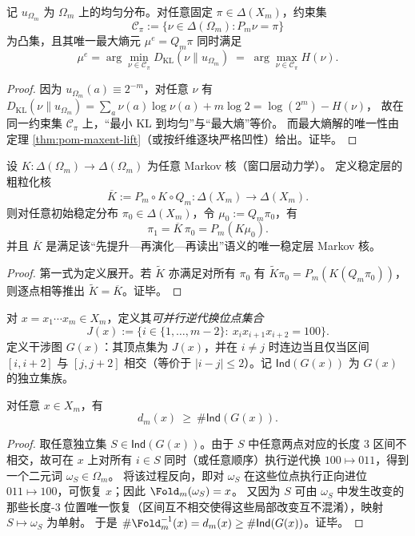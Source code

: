 \begin{corollary}\label{cor:pom-Iproj-maxent}
记 $u_{\Omega_m}$ 为 $\Omega_m$ 上的均匀分布。对任意固定 $\pi\in\Delta(X_m)$，约束集
\[
\mathcal{C}_\pi:=\{\nu\in\Delta(\Omega_m):P_m\nu=\pi\}
\]
为凸集，且其唯一最大熵元 $\mu^e=Q_m\pi$ 同时满足
\[
\boxed{\;
\mu^e=\arg\min_{\nu\in\mathcal{C}_\pi}D_{\mathrm{KL}}(\nu\|u_{\Omega_m})
\;=\;
\arg\max_{\nu\in\mathcal{C}_\pi}H(\nu).
\;}
\]
\end{corollary}
\begin{proof}
因为 $u_{\Omega_m}(a)\equiv 2^{-m}$，对任意 $\nu$ 有
\(
D_{\mathrm{KL}}(\nu\|u_{\Omega_m})=\sum_a \nu(a)\log\nu(a)+m\log 2=\log(2^m)-H(\nu)
\)，
故在同一约束集 $\mathcal{C}_\pi$ 上，“最小 KL 到均匀”与“最大熵”等价。
而最大熵解的唯一性由定理 \ref{thm:pom-maxent-lift}（或按纤维逐块严格凹性）给出。证毕。
\end{proof}

\begin{theorem}\label{thm:pom-coarse-grained-kernel}
设 $K:\Delta(\Omega_m)\to\Delta(\Omega_m)$ 为任意 Markov 核（窗口层动力学）。
定义稳定层的粗粒化核
\[
\overline K:=P_m\circ K\circ Q_m:\Delta(X_m)\to\Delta(X_m).
\]
则对任意初始稳定分布 $\pi_0\in\Delta(X_m)$，令 $\mu_0:=Q_m\pi_0$，有
\[
\pi_1=\overline K\,\pi_0=P_m(K\mu_0).
\]
并且 $\overline K$ 是满足该“先提升—再演化—再读出”语义的唯一稳定层 Markov 核。
\end{theorem}
\begin{proof}
第一式为定义展开。若 $\widetilde K$ 亦满足对所有 $\pi_0$ 有
\(
\widetilde K\pi_0=P_m(K(Q_m\pi_0))
\)，
则逐点相等推出 $\widetilde K=\overline K$。证毕。
\end{proof}

\begin{definition}[可并行逆代换位点与干涉图]\label{def:pom-carry-interference-graph}
对 $x=x_1\cdots x_m\in X_m$，定义其\emph{可并行逆代换位点集合}
\[
J(x):=\{i\in\{1,\dots,m-2\}:\ x_ix_{i+1}x_{i+2}=100\}.
\]
定义干涉图 $G(x)$：其顶点集为 $J(x)$，并在 $i\neq j$ 时连边当且仅当区间 $[i,i+2]$ 与 $[j,j+2]$ 相交（等价于 $|i-j|\le 2$）。记 $\mathsf{Ind}(G(x))$ 为 $G(x)$ 的独立集族。
\end{definition}

\begin{lemma}[自由逆代换给出的纤维下界]\label{lem:pom-fiber-lower-bound-independent-sets}
对任意 $x\in X_m$，有
\[
d_m(x)\ \ge\ \#\mathsf{Ind}(G(x)).
\]
\end{lemma}

\begin{proof}
取任意独立集 $S\in\mathsf{Ind}(G(x))$。由于 $S$ 中任意两点对应的长度 $3$ 区间不相交，故可在 $x$ 上对所有 $i\in S$ 同时（或任意顺序）执行逆代换 $100\mapsto 011$，得到一个二元词 $\omega_S\in\Omega_m$。
将该过程反向，即对 $\omega_S$ 在这些位点执行正向进位 $011\mapsto 100$，可恢复 $x$；因此 $\Fold_m(\omega_S)=x$。
又因为 $S$ 可由 $\omega_S$ 中发生改变的那些长度-$3$ 位置唯一恢复（区间互不相交使得这些局部改变互不混淆），映射 $S\mapsto \omega_S$ 为单射。
于是 $\#\Fold_m^{-1}(x)=d_m(x)\ge \#\mathsf{Ind}(G(x))$。证毕。
\end{proof}

